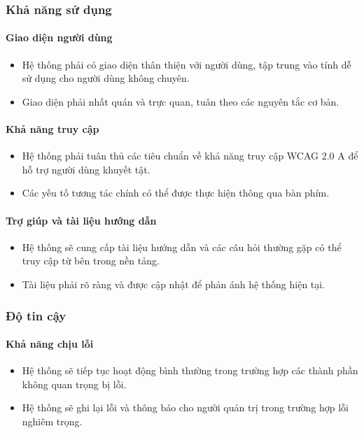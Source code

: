 \subsubsection{Khả năng sử dụng}

\paragraph{Giao diện người dùng}
\begin{itemize}
    \item Hệ thống phải có giao diện thân thiện với người dùng, tập trung vào tính dễ sử dụng cho người dùng không chuyên.
    \item Giao diện phải nhất quán và trực quan, tuân theo các nguyên tắc cơ bản.
\end{itemize}

\paragraph{Khả năng truy cập}
\begin{itemize}
    \item Hệ thống phải tuân thủ các tiêu chuẩn về khả năng truy cập WCAG 2.0 A để hỗ trợ người dùng khuyết tật.
    \item Các yếu tố tương tác chính có thể được thực hiện thông qua bàn phím.
\end{itemize}

\paragraph{Trợ giúp và tài liệu hướng dẫn}
\begin{itemize}
    \item Hệ thống sẽ cung cấp tài liệu hướng dẫn và các câu hỏi thường gặp có thể truy cập từ bên trong nền tảng.
    \item Tài liệu phải rõ ràng và được cập nhật để phản ánh hệ thống hiện tại.
\end{itemize}

\subsubsection{Độ tin cậy}

\paragraph{Khả năng chịu lỗi}
\begin{itemize}
    \item Hệ thống sẽ tiếp tục hoạt động bình thường trong trường hợp các thành phần không quan trọng bị lỗi.
    \item Hệ thống sẽ ghi lại lỗi và thông báo cho người quản trị trong trường hợp lỗi nghiêm trọng.
\end{itemize}

